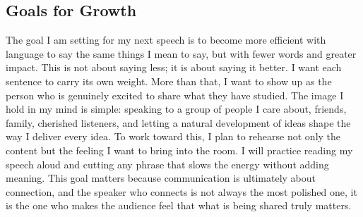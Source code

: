 \documentclass[12pt]{article}
\begin{document}
\subsection*{Goals for Growth}
The goal I am setting for my next speech is to become more efficient with language to say the same things I mean to say, but with fewer words and greater impact. This is not about saying less; it is about saying it better. I want each sentence to carry its own weight. More than that, I want to show up as the person who is genuinely excited to share what they have studied. The image I hold in my mind is simple: speaking to a group of people I care about, friends, family, cherished listeners, and letting a natural development of ideas shape the way I deliver every idea. To work toward this, I plan to rehearse not only the content but the feeling I want to bring into the room. I will practice reading my speech aloud and cutting any phrase that slows the energy without adding meaning. This goal matters because communication is ultimately about connection, and the speaker who connects is not always the most polished one, it is the one who makes the audience feel that what is being shared truly matters.
\end{document}
